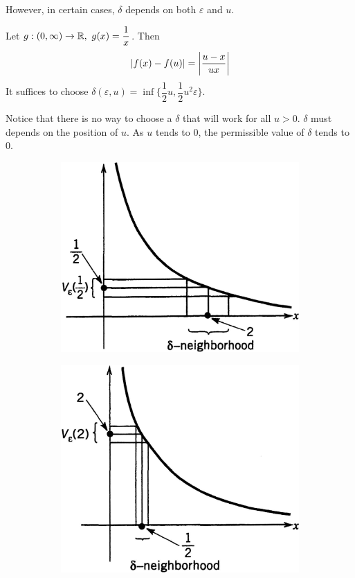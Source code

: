 \documentclass[a4paper,12pt]{article}
\begin{document}
\begin{example}
    However, in certain cases, \(\delta\) depends on both \(\varepsilon\) and \(u\).

    Let \(g:(0,\infty)\rightarrow\R,\ g(x)=\dfrac{1}{x}\). Then 
    \[\left\lvert f(x)-f(u)\right\rvert=\left\lvert \frac{u-x}{ux}\right\rvert\]
    It suffices to choose \(\delta(\varepsilon, u)=\inf\{\dfrac{1}{2}u, \dfrac{1}{2}u^2\varepsilon\}\). 
    
    Notice that there is no way to choose a \(\delta\) that will work for all \(u>0\). \(\delta\) must depends on the position of \(u\). 
    As \(u\) tends to 0, the permissible value of \(\delta\) tends to 0.
    
\end{example}
\begin{figure}[h]
    \centering
    \begin{subfigure}{.45\textwidth}
        \centering
        \includegraphics[width=0.8\linewidth]{image/uniform_1.jpg}
    \end{subfigure}
    \begin{subfigure}{.45\textwidth}
        \centering
        \includegraphics[width=0.8\linewidth]{image/uniform_2.jpg}
    \end{subfigure}
\end{figure}
\end{document}
